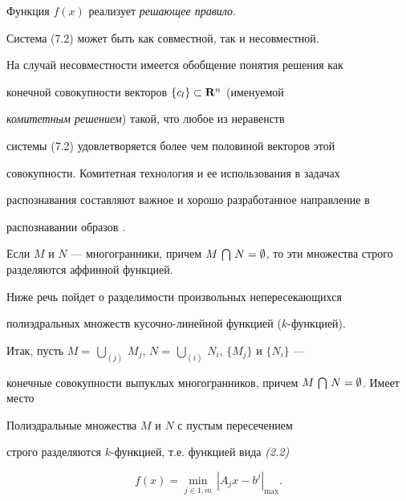 Функция $f(x)$ реализует {\it решающее правило}.


Система (7.2) может быть как совместной, так и несовместной.


На случай несовместности имеется обобщение понятия решения как


конечной совокупности векторов $\{c_l\} \subset\bold R^n$ (именуемой


{\it комитетным решением}) такой, что любое из неравенств


системы (7.2) удовлетворяется более чем половиной векторов этой


совокупности. Комитетная технология и ее использования в задачах


распознавания составляют важное и хорошо разработанное направление в


распознавании образов \cite{Maz}.





Если $M$ и $N$ --- многогранники, причем $M \,\bigcap\,


N = \emp$, то эти множества строго разделяются аффинной функцией.


Ниже речь пойдет о разделимости произвольных непересекающихся


полиэдральных множеств кусочно-линейной функцией ($k$-функцией).





Итак, пусть $M = \,\bigcup\limits_{(j)}\, M_j$, $N =


\,\bigcup\limits_{(i)}\, N_i$, $\{M_j\}$ и $\{N_i\}$ ---


конечные совокупности выпуклых многогранников, причем $M


\,\bigcap\, N = \emp$. Имеет место





\begin{thms}


Полиэдральные множества $M$ и $N$ с пустым пересечением


строго разделяются $k$-функцией, т.е. функцией вида {\em (2.2)}


\begin{equation}


f (x) = \min_{j \in \overline{1,m}}\, |A_j x -b^j|_{\max}.


\end{equation}


\end{thms}





